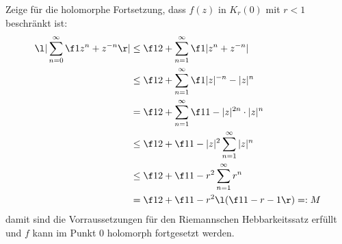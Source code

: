 \documentclass{mywork}
\begin{document}
\begin{aufgabe}
\begin{enumerate}[a)]
				Zeige für die holomorphe Fortsetzung, dass $f(z)$ in $K_r(0)$ mit $r<1$ beschränkt ist:
				\begin{align*}
					\l| \sum_{n=0}^\infty \f 1{z^n + z^{-n}} \r|
					&\le \f 12 + \sum_{n=1}^\infty \f 1{|z^n + z^{-n}|} \\
					&\le \f 12 + \sum_{n=1}^\infty \f 1{|z|^{-n}-|z|^n} \\
					&= \f 12 + \sum_{n=1}^\infty \f 1{1-|z|^{2n}} \cdot |z|^n \\
					&\le \f 12 + \f 1{1-|z|^2} \sum_{n=1}^\infty |z|^n \\
					&\le \f 12 + \f 1{1-r^2} \sum_{n=1}^\infty r^n \\
					&= \f 12 + \f 1{1-r^2} \l( \f 1{1-r} - 1\r) =: M
				\end{align*}
				damit sind die Vorraussetzungen für den Riemannschen Hebbarkeitssatz erfüllt und $f$ kann im Punkt $0$ holomorph fortgesetzt werden.
		\end{enumerate}
	\end{aufgabe}
	
\end{document}

